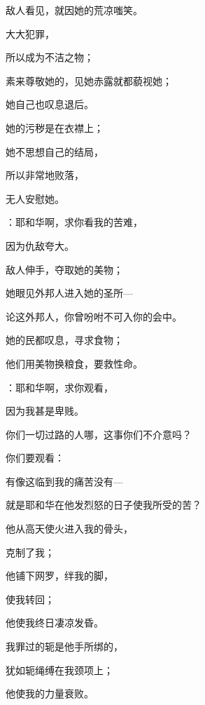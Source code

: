 {\par }{\Q 敌人看见，就因她的荒凉嗤笑。
\par }{\BB \par }{\Q {}大大犯罪，
\par }{\Q 所以成为不洁之物；
\par }{\Q 素来尊敬她的，见她赤露就都藐视她；
\par }{\Q 她自己也叹息退后。
\par }{\BB \par }{\Q {}她的污秽是在衣襟上；
\par }{\Q 她不思想自己的结局，
\par }{\Q 所以非常地败落，
\par }{\Q 无人安慰她。
\par }{：耶和华啊，求你看我的苦难，
\par }{\Q 因为仇敌夸大。
\par }{\BB \par }{\Q {}敌人伸手，夺取她的美物；
\par }{\Q 她眼见外邦人进入她的圣所—
\par }{\Q 论这外邦人，你曾吩咐不可入你的会中。
\par }{\BB \par }{\Q {}她的民都叹息，寻求食物；
\par }{\Q 他们用美物换粮食，要救性命。
\par }{：耶和华啊，求你观看，
\par }{\Q 因为我甚是卑贱。
\par }{\BB \par }{\Q {}你们一切过路的人哪，这事你们不介意吗？
\par }{\Q 你们要观看：
\par }{\Q 有像这临到我的痛苦没有—
\par }{\Q 就是耶和华在他发烈怒的日子使我所受的苦？
\par }{\BB \par }{\Q {}他从高天使火进入我的骨头，
\par }{\Q 克制了我；
\par }{\Q 他铺下网罗，绊我的脚，
\par }{\Q 使我转回；
\par }{\Q 他使我终日凄凉发昏。
\par }{\BB \par }{\Q {}我罪过的轭是他手所绑的，
\par }{\Q 犹如轭绳缚在我颈项上；
\par }{\Q 他使我的力量衰败。
}
